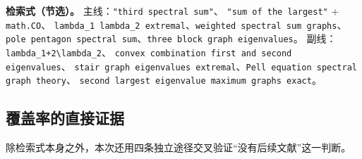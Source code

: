 \documentclass[UTF8,11pt]{ctexart}
\begin{document}
\textbf{检索式（节选）。} 主线：\texttt{"third spectral sum"}、
\texttt{"sum of the largest"} + \texttt{math.CO}、
\texttt{lambda\_1 lambda\_2 extremal}、\texttt{weighted spectral sum graphs}、
\texttt{pole pentagon spectral sum}、\texttt{three block graph eigenvalues}。
副线：\texttt{lambda\_1+2\textbackslash lambda\_2}、
\texttt{convex combination first and second eigenvalues}、
\texttt{stair graph eigenvalues extremal}、\texttt{Pell equation spectral graph theory}、
\texttt{second largest eigenvalue maximum graphs exact}。

\subsection{覆盖率的直接证据}

除检索式本身之外，本次还用四条独立途径交叉验证``没有后续文献''这一判断。
\end{document}
